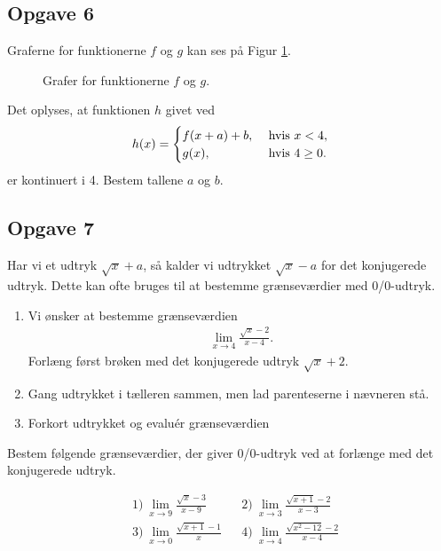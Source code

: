 \newpage
\subsection*{Opgave 6}

Graferne for funktionerne $f$ og $g$ kan ses på Figur \ref{fig:kontopg}.
\begin{figure}[H]
	\centering
	\caption{Grafer for funktionerne $f$ og $g$.}
	\label{fig:kontopg}
\end{figure}
Det oplyses, at funktionen $h$ givet ved
\begin{align*}
	h(x) = 
	\begin{cases}
		f(x + a) + b, &\textnormal{ hvis } x < 4,\\
		g(x), &\textnormal{ hvis } 4 \geq 0. 
	\end{cases}
\end{align*}
er kontinuert i 4. Bestem tallene $a$ og $b$.

\newpage

\subsection*{Opgave 7}
Har vi et udtryk $\sqrt{x} + a$, så kalder vi udtrykket $\sqrt{x} - a$ for det konjugerede udtryk. Dette kan ofte bruges til at bestemme grænseværdier med 0/0-udtryk. 
\begin{enumerate}[label=\roman*)]
	\item Vi ønsker at bestemme grænseværdien
	\begin{align*}
		\lim_{x \to 4} \frac{\sqrt{x}-2}{x-4}.
	\end{align*}
	Forlæng først brøken med det konjugerede udtryk $\sqrt{x}+2$. 
	\item Gang udtrykket i tælleren sammen, men lad parenteserne i nævneren stå.
	\item Forkort udtrykket og evaluér grænseværdien
\end{enumerate}

Bestem følgende grænseværdier, der giver 0/0-udtryk ved at forlænge med det konjugerede udtryk. 

\begin{align*}
	&1) \ \lim_{x \to 9} \frac{\sqrt{x}-3}{x-9}    & &2) \ \lim_{x\to 3}\frac{\sqrt{x+1} - 2}{x-3}  \\
	&3) \ \lim_{x \to 0} \frac{\sqrt{x + 1} - 1}{x}  & &4) \ \lim_{x \to 4} \frac{\sqrt{x^2 -12}-2}{x-4}  \\
\end{align*}
 